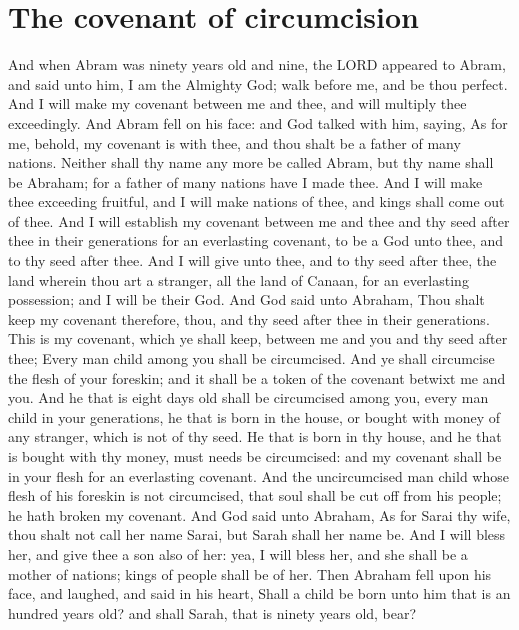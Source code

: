 \section*{The covenant of circumcision}
\begin{biblechapter} %
\verse And when Abram was ninety years old and nine, the LORD appeared to Abram, and said unto him, I am the Almighty God; walk before me, and be thou perfect.
\verse And I will make my covenant between me and thee, and will multiply thee exceedingly.
\verse And Abram fell on his face: and God talked with him, saying,
\verse As for me, behold, my covenant is with thee, and thou shalt be a father of many nations.
\verse Neither shall thy name any more be called Abram, but thy name shall be Abraham; for a father of many nations have I made thee.
\verse And I will make thee exceeding fruitful, and I will make nations of thee, and kings shall come out of thee.
\verse And I will establish my covenant between me and thee and thy seed after thee in their generations for an everlasting covenant, to be a God unto thee, and to thy seed after thee.
\verse And I will give unto thee, and to thy seed after thee, the land wherein thou art a stranger, all the land of Canaan, for an everlasting possession; and I will be their God.
\verse And God said unto Abraham, Thou shalt keep my covenant therefore, thou, and thy seed after thee in their generations.
\verse This is my covenant, which ye shall keep, between me and you and thy seed after thee; Every man child among you shall be circumcised.
\verse And ye shall circumcise the flesh of your foreskin; and it shall be a token of the covenant betwixt me and you.
\verse And he that is eight days old shall be circumcised among you, every man child in your generations, he that is born in the house, or bought with money of any stranger, which is not of thy seed.
\verse He that is born in thy house, and he that is bought with thy money, must needs be circumcised: and my covenant shall be in your flesh for an everlasting covenant.
\verse And the uncircumcised man child whose flesh of his foreskin is not circumcised, that soul shall be cut off from his people; he hath broken my covenant.
\verse And God said unto Abraham, As for Sarai thy wife, thou shalt not call her name Sarai, but Sarah shall her name be.
\verse And I will bless her, and give thee a son also of her: yea, I will bless her, and she shall be a mother of nations; kings of people shall be of her.
\verse Then Abraham fell upon his face, and laughed, and said in his heart, Shall a child be born unto him that is an hundred years old? and shall Sarah, that is ninety years old, bear?

\end{biblechapter}
